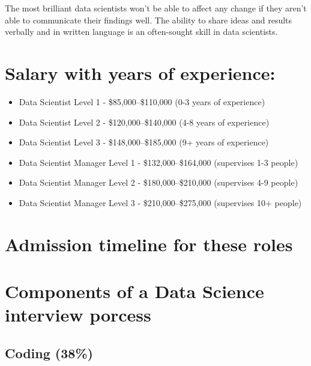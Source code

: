 \documentclass[
]{book}
\providecommand{\tightlist}{%
  \setlength{\itemsep}{0pt}\setlength{\parskip}{0pt}}
\begin{document}
The most brilliant data scientists won't be able to affect any change if they aren't able to communicate their findings well. The ability to share ideas and results verbally and in written language is an often-sought skill in data scientists.

\hypertarget{salary-with-years-of-experience}{%
\section*{Salary with years of experience:}\label{salary-with-years-of-experience}}

\begin{itemize}
\tightlist
\item
  Data Scientist Level 1 - \$85,000--\$110,000 (0-3 years of experience)\\
\item
  Data Scientist Level 2 - \$120,000--\$140,000 (4-8 years of experience)\\
\item
  Data Scientist Level 3 - \$148,000--\$185,000 (9+ years of experience)\\
\item
  Data Scientist Manager Level 1 - \$132,000--\$164,000 (supervises 1-3 people)\\
\item
  Data Scientist Manager Level 2 - \$180,000--\$210,000 (supervises 4-9 people)\\
\item
  Data Scientist Manager Level 3 - \$210,000--\$275,000 (supervises 10+ people)
\end{itemize}

\hypertarget{admission-timeline-for-these-roles}{%
\section*{Admission timeline for these roles}\label{admission-timeline-for-these-roles}}

\hypertarget{components-of-a-data-science-interview-porcess}{%
\section{Components of a Data Science interview porcess}\label{components-of-a-data-science-interview-porcess}}

\hypertarget{coding-38}{%
\subsection{Coding (38\%)}\label{coding-38}}
\end{document}
